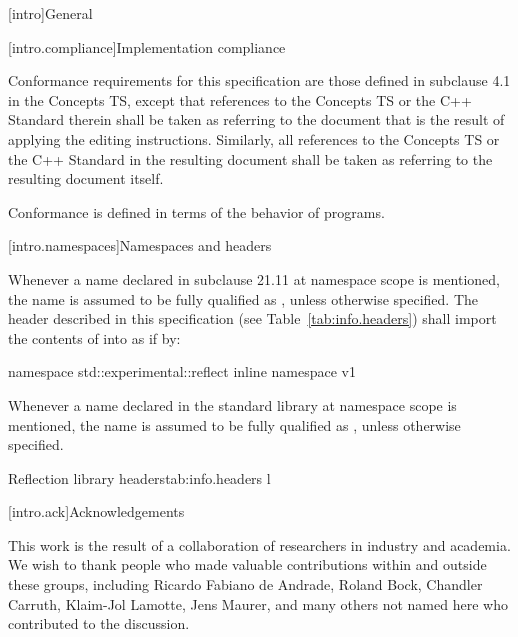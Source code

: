 
[intro]{General}

[intro.compliance]{Implementation compliance}

\pnum
Conformance requirements for this specification are those defined in subclause
4.1 in the Concepts TS, except that references to the Concepts TS or the C++
Standard therein shall be taken as referring to the document that is the result
of applying the editing instructions. Similarly, all references to the Concepts
TS or the C++ Standard in the resulting document shall be taken as referring to
the resulting document itself.
\begin{note}
Conformance is defined in terms of the behavior of programs.
\end{note}

[intro.namespaces]{Namespaces and headers}

\pnum
Whenever a name  declared in subclause 21.11 at namespace scope is
mentioned, the name  is assumed to be fully qualified as
, unless otherwise specified.
The header described in this specification (see Table~\ref{tab:info.headers})
shall import the contents of  into
 as if by:

\begin{codeblock}
namespace std::experimental::reflect {
  inline namespace v1 {}
}
\end{codeblock}

\pnum
Whenever a name  declared in the standard library at namespace scope is
mentioned, the name  is assumed to be fully qualified as
, unless otherwise specified.

\begin{floattable}{Reflection library headers}{tab:info.headers}
{l}
\topline
{} \\
\end{floattable}

[intro.ack]{Acknowledgements}

\pnum
This work is the result of a collaboration of researchers in industry and
academia.  We wish to thank people who made valuable contributions within and
outside these groups, including Ricardo Fabiano de Andrade, Roland Bock,
Chandler Carruth, Klaim-Jol Lamotte, Jens Maurer, and many others not
named here who contributed to the discussion.

